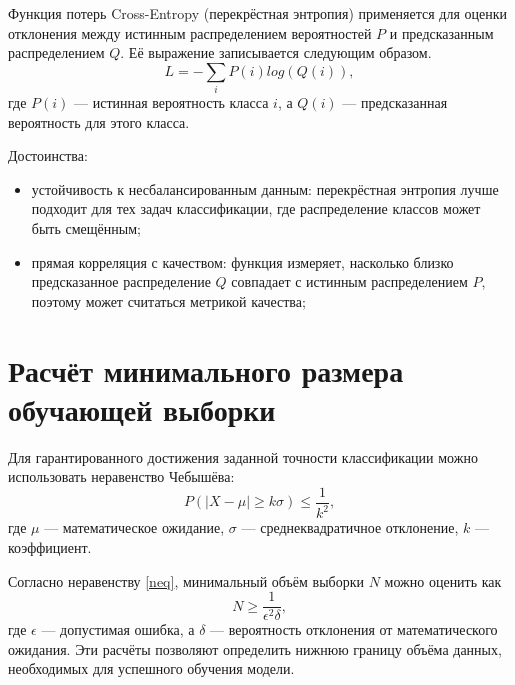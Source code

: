 Функция потерь Cross-Entropy (перекрёстная энтропия) применяется для оценки отклонения между истинным распределением вероятностей $P$ и предсказанным распределением $Q$. Её выражение записывается следующим образом.
\begin{equation}
	L = -\sum_{i} P(i)log(Q(i)),
\end{equation}
где $P(i)$ — истинная вероятность класса $i$, а $Q(i)$ — предсказанная вероятность для этого класса.

Достоинства:
\begin{itemize}[label*=---]
	\item устойчивость к несбалансированным данным: перекрёстная энтропия лучше подходит для тех задач классификации, где распределение классов может быть смещённым;
	\item прямая корреляция с качеством: функция измеряет, насколько близко предсказанное распределение $Q$ совпадает с истинным распределением $P$, поэтому может считаться метрикой качества;
\end{itemize}



\section{Расчёт минимального размера обучающей выборки}

Для гарантированного достижения заданной точности классификации можно использовать неравенство Чебышёва:
\label{neq}
\begin{equation}
	P(| X - \mu | \ge k\sigma) \le \frac{1}{k^2},
\end{equation}
где $\mu$ --- математическое ожидание, $\sigma$ --- среднеквадратичное отклонение, $k$ --- коэффициент.

Согласно неравенству \ref{neq}, минимальный объём выборки $N$ можно оценить как
\begin{equation}
	N \ge \frac{1}{\epsilon^2\delta},
\end{equation}
где $\epsilon$ --- допустимая ошибка, а $\delta$ --- вероятность отклонения от математического ожидания. Эти расчёты позволяют определить нижнюю границу объёма данных, необходимых для успешного обучения модели.



\clearpage
